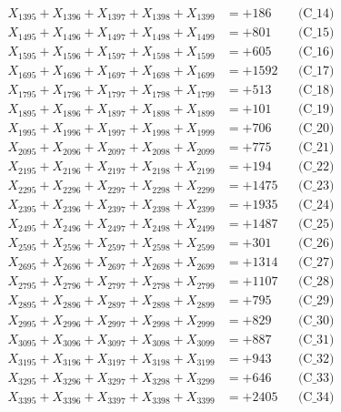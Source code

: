 \documentclass[a4paper,10pt]{article}
\begin{document}
{\begin{align}
X_{1395} + X_{1396} + X_{1397} + X_{1398} + X_{1399} &= +186 && \text{(C\_14)} \\
X_{1495} + X_{1496} + X_{1497} + X_{1498} + X_{1499} &= +801 && \text{(C\_15)} \\
\allowbreak
X_{1595} + X_{1596} + X_{1597} + X_{1598} + X_{1599} &= +605 && \text{(C\_16)} \\
X_{1695} + X_{1696} + X_{1697} + X_{1698} + X_{1699} &= +1592 && \text{(C\_17)} \\
X_{1795} + X_{1796} + X_{1797} + X_{1798} + X_{1799} &= +513 && \text{(C\_18)} \\
X_{1895} + X_{1896} + X_{1897} + X_{1898} + X_{1899} &= +101 && \text{(C\_19)} \\
X_{1995} + X_{1996} + X_{1997} + X_{1998} + X_{1999} &= +706 && \text{(C\_20)} \\
\allowbreak
X_{2095} + X_{2096} + X_{2097} + X_{2098} + X_{2099} &= +775 && \text{(C\_21)} \\
X_{2195} + X_{2196} + X_{2197} + X_{2198} + X_{2199} &= +194 && \text{(C\_22)} \\
X_{2295} + X_{2296} + X_{2297} + X_{2298} + X_{2299} &= +1475 && \text{(C\_23)} \\
X_{2395} + X_{2396} + X_{2397} + X_{2398} + X_{2399} &= +1935 && \text{(C\_24)} \\
X_{2495} + X_{2496} + X_{2497} + X_{2498} + X_{2499} &= +1487 && \text{(C\_25)} \\
\allowbreak
X_{2595} + X_{2596} + X_{2597} + X_{2598} + X_{2599} &= +301 && \text{(C\_26)} \\
X_{2695} + X_{2696} + X_{2697} + X_{2698} + X_{2699} &= +1314 && \text{(C\_27)} \\
X_{2795} + X_{2796} + X_{2797} + X_{2798} + X_{2799} &= +1107 && \text{(C\_28)} \\
X_{2895} + X_{2896} + X_{2897} + X_{2898} + X_{2899} &= +795 && \text{(C\_29)} \\
X_{2995} + X_{2996} + X_{2997} + X_{2998} + X_{2999} &= +829 && \text{(C\_30)} \\
\allowbreak
X_{3095} + X_{3096} + X_{3097} + X_{3098} + X_{3099} &= +887 && \text{(C\_31)} \\
X_{3195} + X_{3196} + X_{3197} + X_{3198} + X_{3199} &= +943 && \text{(C\_32)} \\
X_{3295} + X_{3296} + X_{3297} + X_{3298} + X_{3299} &= +646 && \text{(C\_33)} \\
X_{3395} + X_{3396} + X_{3397} + X_{3398} + X_{3399} &= +2405 && \text{(C\_34)} \\

\end{align}}
\end{document}
